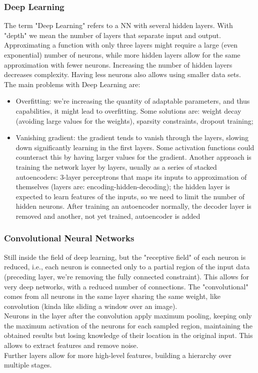\subsubsection{Deep Learning}
The term "Deep Learning" refers to a NN with several hidden layers. With "depth" we mean the number of layers that separate input and output. \\
Approximating a function with only three layers might require a large (even exponential) number of neurons, while more hidden layers allow for the same approximation with fewer neurons. Increasing the number of hidden layers decreases complexity. Having less neurons also allows using smaller data sets.\\

The main problems with Deep Learning are: 
\begin{itemize}
	\item Overfitting: we're increasing the quantity of adaptable parameters, and thus capabilities, it might lead to overfitting. Some solutions are: weight decay (avoiding large values for the weights), sparsity constraints, dropout training; 
	\item Vanishing gradient: the gradient tends to vanish through the layers, slowing down significantly learning in the first layers. Some activation functions could counteract this by having larger values for the gradient. Another approach is training the network layer by layers, usually as a series of stacked autoencoders: 3-layer perceptrons that maps its inputs to approximation of themselves (layers are: encoding-hidden-decoding); the hidden layer is expected to learn features of the inputs, so we need to limit the number of hidden neurons. After training an autoencoder normally, the decoder layer is removed and another, not yet trained, autoencoder is added
\end{itemize}

\subsubsection{Convolutional Neural Networks}
Still inside the field of deep learning, but the "receptive field" of each neuron is reduced, i.e., each neuron is connected only to a partial region of the input data (preceding layer, we're removing the fully connected constraint). This allows for very deep networks, with a reduced number of connections. The "convolutional" comes from all neurons in the same layer sharing the same weight, like convolution (kinda like sliding a window over an image).\\
Neurons in the layer after the convolution apply maximum pooling, keeping only the maximum activation of the neurons for each sampled region, maintaining the obtained results but losing knowledge of their location in the original input. This allows to extract features and remove noise. \\
Further layers allow for more high-level features, building a hierarchy over multiple stages.\\

